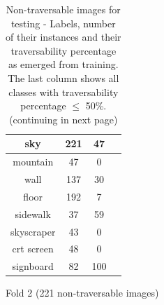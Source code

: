 \documentclass[12pt,a4paper,table,dvipsnames,tikz]{report}
\begin{document}
\begin{table}[h!]
\begin{subtable}[h!]{\textwidth}
\begin{tabular}{|c|c|c|c|}
				\hline
				\rowcolor{sky}
				sky & 221 & 47 & \checkmark\\
				\hline
				mountain & 47 & 0 & \checkmark\\
				\hline
				wall & 137 & 30 & \checkmark\\
				\hline
				floor & 192 & 7 & \checkmark\\
				\hline
				sidewalk & 37 & 59 &\\
				\hline
				skyscraper & 43 & 0 & \checkmark\\
				\hline
				crt screen & 48 & 0 & \checkmark\\
				\hline
				signboard & 82 & 100 &\\
				\hline
			\end{tabular}
			\caption{Fold 2 (221 non-traversable images)}
			\label{table:obst.f2}
		\end{subtable}
		\caption{Non-traversable images for testing - Labels, number of their instances and their 
			traversability percentage as emerged from training. The last column shows all classes 
			with traversability percentage $\le$ 50\%. (continuing in next page)}
		\label{table:obst.folds}
	\end{table}
	
\end{document}
